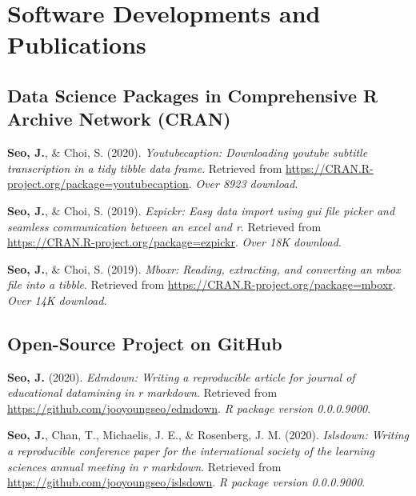 \documentclass[11pt, a4paper]{awesome-cv}
\begin{document}
\hypertarget{software-developments-and-publications}{%
\section{Software Developments and
Publications}\label{software-developments-and-publications}}

\hypertarget{data-science-packages-in-comprehensive-r-archive-network-cran}{%
\subsection{Data Science Packages in Comprehensive R Archive Network
(CRAN)}\label{data-science-packages-in-comprehensive-r-archive-network-cran}}

\hypertarget{refs_R_packages}{}
\leavevmode\hypertarget{ref-R-youtubecaption}{}%
\textbf{Seo, J.}, \& Choi, S. (2020). \emph{Youtubecaption: Downloading
youtube subtitle transcription in a tidy tibble data frame}. Retrieved
from \url{https://CRAN.R-project.org/package=youtubecaption}. \emph{Over
8923 download}.

\leavevmode\hypertarget{ref-R-ezpickr}{}%
\textbf{Seo, J.}, \& Choi, S. (2019). \emph{Ezpickr: Easy data import
using gui file picker and seamless communication between an excel and
r}. Retrieved from \url{https://CRAN.R-project.org/package=ezpickr}.
\emph{Over 18K download}.

\leavevmode\hypertarget{ref-R-mboxr}{}%
\textbf{Seo, J.}, \& Choi, S. (2019). \emph{Mboxr: Reading, extracting,
and converting an mbox file into a tibble}. Retrieved from
\url{https://CRAN.R-project.org/package=mboxr}. \emph{Over 14K
download}.

\hypertarget{open-source-project-on-github}{%
\subsection{Open-Source Project on
GitHub}\label{open-source-project-on-github}}

\hypertarget{refs_github_projects}{}
\leavevmode\hypertarget{ref-R-edmdown}{}%
\textbf{Seo, J.} (2020). \emph{Edmdown: Writing a reproducible article
for journal of educational datamining in r markdown}. Retrieved from
\url{https://github.com/jooyoungseo/edmdown}. \emph{R package version
0.0.0.9000}.

\leavevmode\hypertarget{ref-R-islsdown}{}%
\textbf{Seo, J.}, Chan, T., Michaelis, J. E., \& Rosenberg, J. M.
(2020). \emph{Islsdown: Writing a reproducible conference paper for the
international society of the learning sciences annual meeting in r
markdown}. Retrieved from \url{https://github.com/jooyoungseo/islsdown}.
\emph{R package version 0.0.0.9000}.
\end{document}
